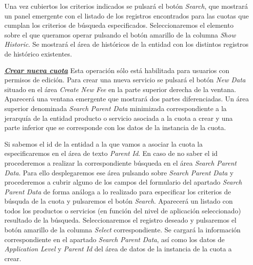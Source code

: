 Una vez cubiertos los criterios indicados se pulsará el botón \emph{Search}, que mostrará un panel emergente con el listado de los registros encontrados para las cuotas que cumplan los criterios de búsqueda especificados. Seleccionaremos el elemento sobre el que queramos operar pulsando el botón amarillo de la columna \emph{Show Historic}. Se mostrará el área de históricos de la entidad con los distintos registros de histórico existentes.


\underline{\textsl{\textbf{Crear nueva cuota}}}\newline
Esta operación sólo está habilitada para usuarios con permisos de edición.
Para crear una nueva servicio se pulsará el botón \textit{New Data} situado en el área \emph{Create New Fee} en la parte superior derecha de la ventana. Aparecerá una ventana emergente que mostrará dos partes diferenciadas. Un área superior denominada \emph{Search Parent Data} minimizada correspondiente a la jerarquía de la entidad producto o servicio asociada a la cuota a crear y una parte inferior que se corresponde con los datos de la instancia de la cuota.

Si sabemos el id de la entidad a la que vamos a asociar la cuota la especificaremos en el área de texto \emph{Parent Id}. En caso de no saber el id procederemos a realizar la correspondiente búsqueda en el área  \emph{Search Parent Data}. Para ello desplegaremos ese área pulsando sobre \emph{Search Parent Data} y procederemos a cubrir alguno de los campos del formulario del apartado \emph{Search Parent Data} de forma análoga a lo realizado para especificar los criterios de búsquda de la cuota y pulsaremos el botón \emph{Search}. Aparecerá un listado con todos los productos o servicios (en función del nivel de aplicación seleccionado) resultado de la búsqueda. Seleccionaremos el registro deseado y pulsaremos el botón amarillo de la columna \emph{Select} correspondiente. Se cargará la información correspondiente en el apartado \emph{Search Parent Data}, así como los datos de \emph{Application Level} y \emph{Parent Id} del área de datos de la instancia de la cuota a crear.

